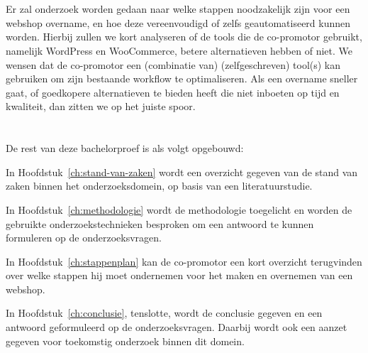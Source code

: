 \section{}%
\label{sec:onderzoeksdoelstelling}


Er zal onderzoek worden gedaan naar welke stappen noodzakelijk zijn voor een webshop overname, en hoe deze vereenvoudigd of zelfs geautomatiseerd kunnen worden. Hierbij zullen we kort analyseren of de tools die de co-promotor gebruikt, namelijk WordPress en WooCommerce, betere alternatieven hebben of niet. We wensen dat de co-promotor een (combinatie van) (zelfgeschreven) tool(s) kan gebruiken om zijn bestaande workflow te optimaliseren. Als een overname sneller gaat, of goedkopere alternatieven te bieden heeft die niet inboeten op tijd en kwaliteit, dan zitten we op het juiste spoor.

\section{}%
\label{sec:opzet-bachelorproef}


De rest van deze bachelorproef is als volgt opgebouwd:

In Hoofdstuk~\ref{ch:stand-van-zaken} wordt een overzicht gegeven van de stand van zaken binnen het onderzoeksdomein, op basis van een literatuurstudie.

In Hoofdstuk~\ref{ch:methodologie} wordt de methodologie toegelicht en worden de gebruikte onderzoekstechnieken besproken om een antwoord te kunnen formuleren op de onderzoeksvragen.

In Hoofdstuk~\ref{ch:stappenplan} kan de co-promotor een kort overzicht terugvinden over welke stappen hij moet ondernemen voor het maken en overnemen van een webshop.

In Hoofdstuk~\ref{ch:conclusie}, tenslotte, wordt de conclusie gegeven en een antwoord geformuleerd op de onderzoeksvragen. Daarbij wordt ook een aanzet gegeven voor toekomstig onderzoek binnen dit domein.
